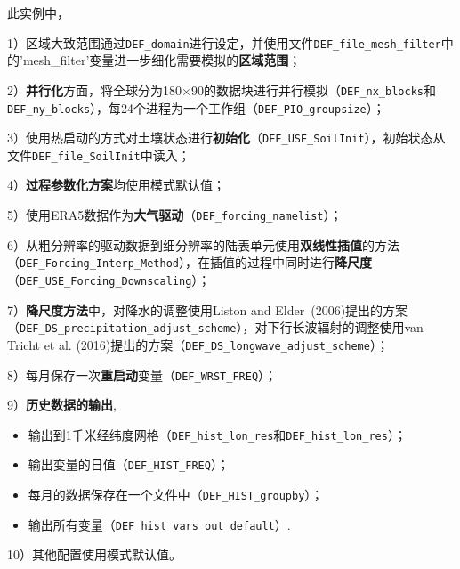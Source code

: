 此实例中，\par
1）区域大致范围通过\texttt{DEF\_domain}进行设定，并使用文件\texttt{DEF\_file\_mesh\_filter}中的'mesh\_filter'变量进一步细化需要模拟的\textbf{区域范围}；\par
2）\textbf{并行化}方面，将全球分为180\textdegree$\times$90\textdegree 的数据块进行并行模拟（\texttt{DEF\_nx\_blocks}和\texttt{DEF\_ny\_blocks}），每24个进程为一个工作组（\texttt{DEF\_PIO\_groupsize}）；\par
3）使用热启动的方式对土壤状态进行\textbf{初始化}（\texttt{DEF\_USE\_SoilInit}），初始状态从文件\texttt{DEF\_file\_SoilInit}中读入；\par
4）\textbf{过程参数化方案}均使用模式默认值；\par
5）使用ERA5数据作为\textbf{大气驱动}（\texttt{DEF\_forcing\_namelist}）；\par
6）从粗分辨率的驱动数据到细分辨率的陆表单元使用\textbf{双线性插值}的方法\\ （\texttt{DEF\_Forcing\_Interp\_Method}），在插值的过程中同时进行\textbf{降尺度}\\ （\texttt{DEF\_USE\_Forcing\_Downscaling}）；\par
7）\textbf{降尺度方法}中，对降水的调整使用Liston and Elder~(2006)提出的方案\\ （\texttt{DEF\_DS\_precipitation\_adjust\_scheme}），对下行长波辐射的调整使用van Tricht et al. (2016)提出的方案（\texttt{DEF\_DS\_longwave\_adjust\_scheme}）；\par
8）每月保存一次\textbf{重启动}变量（\texttt{DEF\_WRST\_FREQ}）；\par
9）\textbf{历史数据的输出},
\begin{itemize}[nosep,leftmargin=4em]
    \item 输出到1千米经纬度网格（\texttt{DEF\_hist\_lon\_res}和\texttt{DEF\_hist\_lon\_res}）；
    \item 输出变量的日值（\texttt{DEF\_HIST\_FREQ}）；
    \item 每月的数据保存在一个文件中（\texttt{DEF\_HIST\_groupby}）；
    \item 输出所有变量（\texttt{DEF\_hist\_vars\_out\_default}）.
\end{itemize}\par
10）其他配置使用模式默认值。

